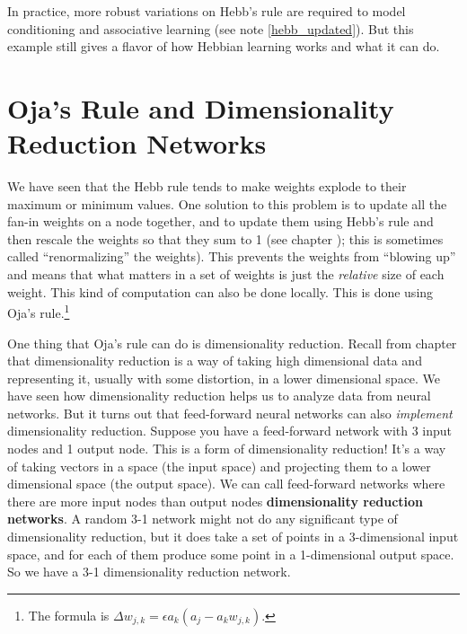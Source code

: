 In practice, more robust variations on Hebb's rule are required to model conditioning and associative learning (see note \ref{hebb_updated}). But this example still gives a flavor of how Hebbian learning works and what it can do.

\section{Oja's Rule and Dimensionality Reduction Networks}


We have seen that the Hebb rule tends to make weights explode to their maximum or minimum values. One solution to this problem is to update all the fan-in weights on a node together, and to update them using Hebb's rule and then rescale the weights so that they sum to 1 (see chapter ); this is sometimes called ``renormalizing'' the weights). This prevents the weights from ``blowing up'' and means that what matters in a set of weights is just the \emph{relative} size of each weight. This kind of computation can also be done locally. This is done using Oja's rule.\footnote{The formula is $\Delta w_{j,k} = \epsilon a_k (a_j - a_k  w_{j,k})$.}

One thing that Oja's rule can do is dimensionality reduction. Recall from chapter  that dimensionality reduction is a way of taking high dimensional data and representing it, usually with some distortion, in a lower dimensional space. We have seen how dimensionality reduction helps us to analyze data from neural networks. But it turns out that feed-forward neural networks can also \emph{implement} dimensionality reduction. Suppose you have a feed-forward network with 3 input nodes and 1 output node. This is a form of dimensionality reduction!  It's a way of taking vectors in a space (the input space) and projecting them to a lower dimensional space (the output space). We can call feed-forward networks where there are more input nodes than output nodes \textbf{dimensionality reduction networks}. A random 3-1 network might  not do any significant type of dimensionality reduction, but it does take a set of points in a 3-dimensional input space, and for each of them produce some point in a 1-dimensional output space. So we have a 3-1 dimensionality reduction network. 

